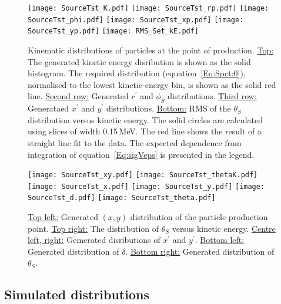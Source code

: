 \begin{figure}
  \begin{center}
    \texttt{[image: SourceTst\_K.pdf]}
    \texttt{[image: SourceTst\_rp.pdf]}
    \texttt{[image: SourceTst\_phi.pdf]}
    \texttt{[image: SourceTst\_xp.pdf]}
    \texttt{[image: SourceTst\_yp.pdf]}
    \texttt{[image: RMS\_Set\_kE.pdf]}
  \end{center}
  \caption{Kinematic distributions of particles at the point of
    production.
    \underline{Top:} The generated kinetic energy disribution is shown
    as the solid histogram. 
    The required distribution (equation~\ref{Eq:Spct:0}), normalised
    to the lowest kinetic-energy bin, is shown as the solid red line.
    \underline{Second row:} Generated $r^\prime$ and $\phi_S$
    distributions. 
    \underline{Third row:} Generataed $x^\prime$ and $y^\prime$
    distributions. 
    \underline{Bottom:} RMS of the $\theta_S$ distribution versus
    kinetic energy.
    The solid circles are calculated using slices of width 0.15\,MeV.
    The red line shows the result of a straight line fit to the data.
    The expected dependence from integration of
    equation~\ref{Eq:sigVeps} is presented in the legend.
  }
  \label{Fig:LsrDrvSrc:Dists}
\end{figure}

\begin{figure}
  \begin{center}
    \texttt{[image: SourceTst\_xy.pdf]}
    \texttt{[image: SourceTst\_thetaK.pdf]}
    \texttt{[image: SourceTst\_x.pdf]}
    \texttt{[image: SourceTst\_y.pdf]}
    \texttt{[image: SourceTst\_d.pdf]}
    \texttt{[image: SourceTst\_theta.pdf]}
  \end{center}
  \caption{
    \underline{Top left:} Generated $(x, y)$ distribution of the
    particle-production point.
    \underline{Top right:} The distribution of $\theta_S$ versus
    kinetic energy.
    \underline{Centre left, right:} Gemerated disributions of
    $x^\prime$ and $y^\prime$.
    \underline{Bottom left:} Generated distribution of $\delta$.
    \underline{Bottom right:} Generated distribution of $\theta_S$.
  }
  \label{Fig:LsrDrvSrc:Dists}
\end{figure}

\subsection{Simulated distributions}

